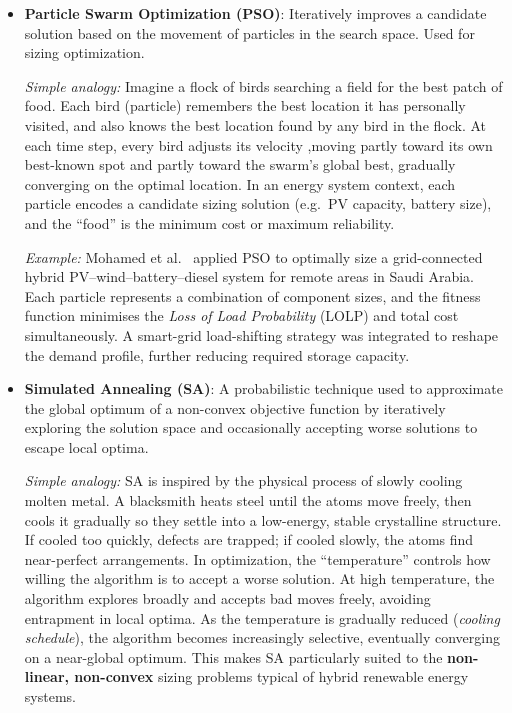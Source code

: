 \documentclass[11pt,a4paper]{report}
\begin{document}
\begin{itemize}
    \textit{Example:} Mahesh and Sandhu~\cite{mahesh2017ga} applied a GA to optimally size a grid-connected PV--wind--battery hybrid system. Each individual in the population encodes the number of PV modules, wind turbines, and battery units. The fitness function minimises the total system cost while satisfying a reliability constraint (battery state of charge and power-balance). The GA converges to a Pareto-optimal sizing configuration that outperforms classical rule-based approaches in both cost and reliability.

    \item \textbf{Particle Swarm Optimization (PSO)}: Iteratively improves a candidate solution based on the movement of particles in the search space. Used for sizing optimization.

\textit{Simple analogy:} Imagine a flock of birds searching a field for the best patch of food. Each bird (particle) remembers the best location it has personally visited, and also knows the best location found by any bird in the flock. At each time step, every bird adjusts its velocity ,moving partly toward its own best-known spot and partly toward the swarm's global best, gradually converging on the optimal location. In an energy system context, each particle encodes a candidate sizing solution (e.g.\ PV capacity, battery size), and the ``food'' is the minimum cost or maximum reliability.

\textit{Example:} Mohamed et al.~\cite{mohamed2016pso} applied PSO to optimally size a grid-connected hybrid PV--wind--battery--diesel system for remote areas in Saudi Arabia. Each particle represents a combination of component sizes, and the fitness function minimises the \textit{Loss of Load Probability} (LOLP) and total cost simultaneously. A smart-grid load-shifting strategy was integrated to reshape the demand profile, further reducing required storage capacity.
    \item \textbf{Simulated Annealing (SA)}: A probabilistic technique used to approximate the global optimum of a non-convex objective function by iteratively exploring the solution space and occasionally accepting worse solutions to escape local optima.

\textit{Simple analogy:} SA is inspired by the physical process of slowly cooling molten metal. A blacksmith heats steel until the atoms move freely, then cools it gradually so they settle into a low-energy, stable crystalline structure. If cooled too quickly, defects are trapped; if cooled slowly, the atoms find near-perfect arrangements. In optimization, the ``temperature'' controls how willing the algorithm is to accept a worse solution. At high temperature, the algorithm explores broadly and accepts bad moves freely, avoiding entrapment in local optima. As the temperature is gradually reduced (\textit{cooling schedule}), the algorithm becomes increasingly selective, eventually converging on a near-global optimum. This makes SA particularly suited to the \textbf{non-linear, non-convex} sizing problems typical of hybrid renewable energy systems.


\end{itemize}
\end{document}
